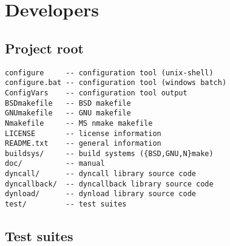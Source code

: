 %
%
%
%

\newpage
\section{Developers}

\subsection{Project root}
\begin{verbatim}
configure     -- configuration tool (unix-shell)
configure.bat -- configuration tool (windows batch)
ConfigVars    -- configuration tool output
BSDmakefile   -- BSD makefile
GNUmakefile   -- GNU makefile
Nmakefile     -- MS nmake makefile
LICENSE       -- license information
README.txt    -- general information
buildsys/     -- build systems ({BSD,GNU,N}make)
doc/          -- manual
dyncall/      -- dyncall library source code
dyncallback/  -- dyncallback library source code
dynload/      -- dynload library source code
test/         -- test suites
\end{verbatim}

\subsection{Test suites}

